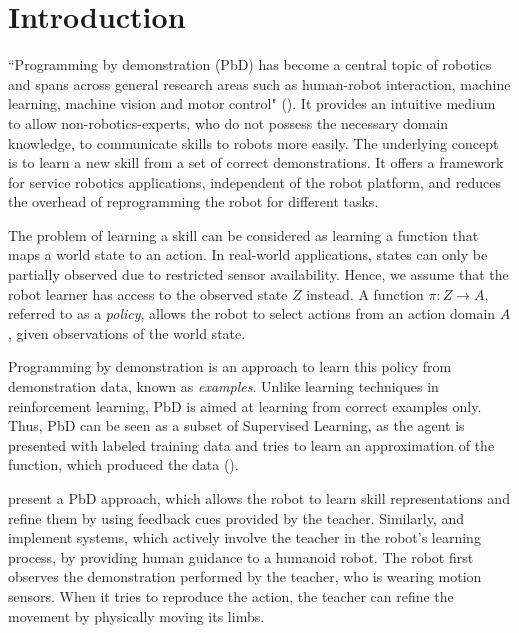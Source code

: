 \section{Introduction}
``Programming by demonstration (PbD) has become a central topic of robotics and spans across general research areas such as human-robot interaction, machine learning, machine vision and motor control" (\cite{billard2008robot}).
It provides an intuitive medium to allow non-robotics-experts, who do not possess the necessary domain knowledge, to communicate skills to robots more easily.
 The underlying concept is to learn a new skill from a set of correct demonstrations.
It offers a framework for service robotics applications, independent of the robot platform, and reduces the overhead of reprogramming the robot for different tasks.

The problem of learning a skill can be considered as learning a function that maps a world state to an action.
 In real-world applications, states can only be partially observed due to restricted sensor availability.
 Hence, we assume that the robot learner has access to the observed state $Z$ instead.
 A function $\pi : Z \rightarrow A$, referred to as a \textit{policy}, allows the robot to select actions from an action domain $A$, given observations of the world state.
 
Programming by demonstration is an approach to learn this policy from demonstration data, known as \textit{examples}.
Unlike learning techniques in reinforcement learning, PbD is aimed at learning from correct examples only.
 Thus, PbD can be seen as a subset of Supervised Learning, as the agent is presented with labeled training data and tries to learn an approximation of the function, which produced the data (\cite{argall2009survey}).

 \cite{nicolescu2003natural} present a PbD approach, which allows the robot to learn skill representations and refine them by using feedback cues provided by the teacher.
 Similarly, \cite{calinon2007active} and \cite{calinon2007incremental} implement systems, which actively involve the teacher in the robot's learning process, by providing human guidance to a humanoid robot.
 The robot first observes the demonstration performed by the teacher, who is wearing motion sensors.
 When it tries to reproduce the action, the teacher can refine the movement by physically moving its limbs.

